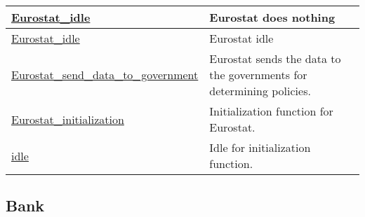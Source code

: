 \documentclass[a4paper,11pt]{article}
\begin{document}
\begin{landscape}
\begin{longtable}[H!]{ll}
\midrule
\url{Eurostat_idle} \index{\url{Eurostat_idle}} & \parbox{10cm}{Eurostat does nothing} \\
\midrule
\url{Eurostat_idle}  & \parbox{10cm}{Eurostat idle} \\
\midrule
\url{Eurostat_send_data_to_government}  & \parbox{10cm}{Eurostat sends the data to the governments for determining policies.} \\
\midrule
\url{Eurostat_initialization}  & \parbox{10cm}{Initialization function for Eurostat.} \\
\midrule
\url{idle}  & \parbox{10cm}{Idle for initialization function.} \\
\end{longtable}
\end{landscape}



\clearpage
\subsection{Bank}
\end{document}
